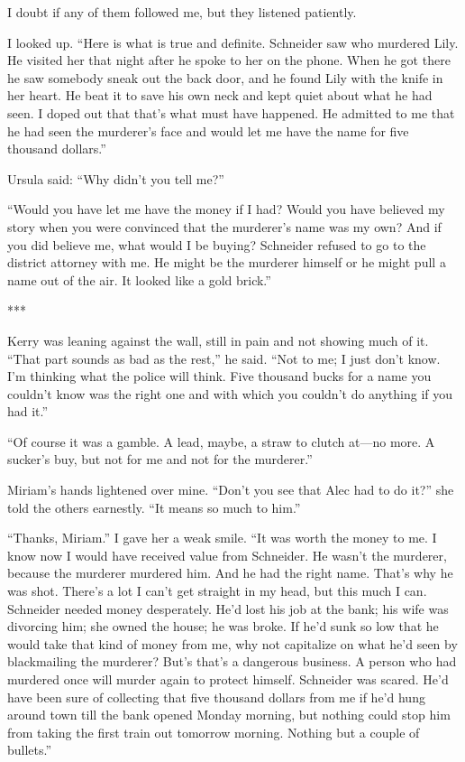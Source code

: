 \documentclass{novel}
\begin{document}
{I doubt if any of them followed me, but they listened patiently.

I looked up. “Here is what is true and definite. Schneider saw who murdered Lily. He visited her that night after he spoke to her on the phone. When he got there he saw somebody sneak out the back door, and he found Lily with the knife in her heart. He beat it to save his own neck and kept quiet about what he had seen. I doped out that that’s what must have happened. He admitted to me that he had seen the murderer’s face and would let me have the name for five thousand dollars.”

Ursula said: “Why didn’t you tell me?”

“Would you have let me have the money if I had? Would you have believed my story when you were convinced that the murderer’s name was my own? And if you did believe me, what would I be buying? Schneider refused to go to the district attorney with me. He might be the murderer himself or he might pull a name out of the air. It looked like a gold brick.”

***

Kerry was leaning against the wall, still in pain and not showing much of it. “That part sounds as bad as the rest,” he said. “Not to me; I just don’t know. I’m thinking what the police will think. Five thousand bucks for a name you couldn’t know was the right one and with which you couldn’t do anything if you had it.”

“Of course it was a gamble. A lead, maybe, a straw to clutch at—no more. A sucker’s buy, but not for me and not for the murderer.”

Miriam’s hands lightened over mine. “Don’t you see that Alec had to do it?” she told the others earnestly. “It means so much to him.”

“Thanks, Miriam.” I gave her a weak smile. “It was worth the money to me. I know now I would have received value from Schneider. He wasn’t the murderer, because the murderer murdered him. And he had the right name. That’s why he was shot. There’s a lot I can’t get straight in my head, but this much I can. Schneider needed money desperately. He’d lost his job at the bank; his wife was divorcing him; she owned the house; he was broke. If he’d sunk so low that he would take that kind of money from me, why not capitalize on what he’d seen by blackmailing the murderer? But’s that’s a dangerous business. A person who had murdered once will murder again to protect himself. Schneider was scared. He’d have been sure of collecting that five thousand dollars from me if he’d hung around town till the bank opened Monday morning, but nothing could stop him from taking the first train out tomorrow morning. Nothing but a couple of bullets.”

}
\end{document}
